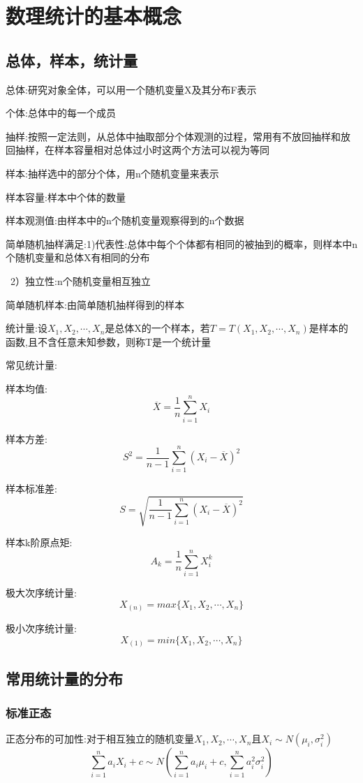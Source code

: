 \documentclass[11pt,twoside,a4paper]{ctexart}
\begin{document}
\section{数理统计的基本概念}
\subsection{总体，样本，统计量}
总体:研究对象全体，可以用一个随机变量X及其分布F表示

个体:总体中的每一个成员

抽样:按照一定法则，从总体中抽取部分个体观测的过程，常用有不放回抽样和放回抽样，在样本容量相对总体过小时这两个方法可以视为等同

样本:抽样选中的部分个体，用n个随机变量来表示

样本容量:样本中个体的数量

样本观测值:由样本中的n个随机变量观察得到的n个数据

简单随机抽样满足:1)代表性:总体中每个个体都有相同的被抽到的概率，则样本中n个随机变量和总体X有相同的分布 

\  2）独立性:n个随机变量相互独立

简单随机样本:由简单随机抽样得到的样本

统计量:设$X_1,X_2,\cdots ,X_n$是总体X的一个样本，若$T = T(X_1,X_2,\cdots ,X_n)$是样本的函数,且不含任意未知参数，则称T是一个统计量

常见统计量:
\begin{minipage}[t]{0.9\linewidth}
    样本均值:
    \[\overline{X} = \frac{1}{n}\sum _{i=1}^n X_i\]

    样本方差:
    \[S^2 = \frac{1}{n-1}\sum _{i=1}^n (X_i - \overline{X})^2\]

    样本标准差:
    \[S = \sqrt{\frac{1}{n-1}\sum _{i=1}^n (X_i - \overline{X})^2} \]

    样本k阶原点矩:
    \[A_k = \frac{1}{n}\sum _{i=1}^n X_i^k\]

    极大次序统计量:
    \[X_{(n)} = max\{X_1,X_2,\cdots ,X_n \}\]

    极小次序统计量:
    \[X_{(1)} = min\{X_1,X_2,\cdots ,X_n \}\]

\end{minipage}

\subsection{常用统计量的分布}

\subsubsection{标准正态}
正态分布的可加性:对于相互独立的随机变量$X_1,X_2,\cdots , X_n$且$X_i \sim N(\mu _i,\sigma _i^2)$
\[\sum _{i=1}^na_iX_i + c \sim N(\sum _{i=1}^na_i \mu _i + c,\sum _{i=1}^n a_i^2\sigma _i^2)\]
\end{document}
